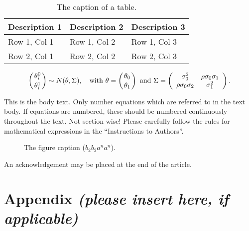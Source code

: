 \documentclass[bimj,fleqn]{w-art}\usepackage[]{graphicx}\usepackage[]{color}
\theoremstyle{plain}
\theoremstyle{definition}
\begin{document}
  \begin{table}[htb]
  \begin{center}
  \caption{The caption of a table.}
  \begin{tabular}{lll}
  \hline
  Description 1 & Description 2 & Description 3\\
  \hline
  Row 1, Col 1 & Row 1, Col 2 & Row 1, Col 3\\
  Row 2, Col 1 & Row 2, Col 2 & Row 2, Col 3\\
  \hline
  \end{tabular}
  \end{center}
  \end{table}
  \begin{equation}
  \left({\theta^{0}_{i}}\atop{\theta^{1}_{i}}\right) \sim N(\theta,\Sigma),\quad {\mathrm{with}}\
  {{\theta}} = \left({\theta_{0}}\atop{\theta_{1}}\right)\ {\mathrm{and}}\ \Sigma =
  \left(\begin{array}{cc}
  \sigma^{2}_{0} & \rho\sigma_{0}\sigma_{1}\\
  \rho\sigma_{0}\sigma_{2} & \sigma^{2}_{1}
  \end{array}\right).
  \end{equation}

  \noindent This is the body text. Only number equations which are referred to in the text body. If equations
  are numbered, these should be numbered continuously throughout the text. Not section wise! Please
  carefully follow the rules for mathematical expressions in the ``Instructions to Authors''.

  \begin{figure}[htb]
  \begin{center}
  \caption{The figure caption ($b_{2}b_{2}a^{n}a^{n}$).}
  \end{center}
  \end{figure}
  \begin{acknowledgement}
  An acknowledgement may be placed at the end of the article.
  \end{acknowledgement}
  \vspace*{1pc}



  \section*{Appendix {\it(please insert here, if applicable)}}
\end{document}
